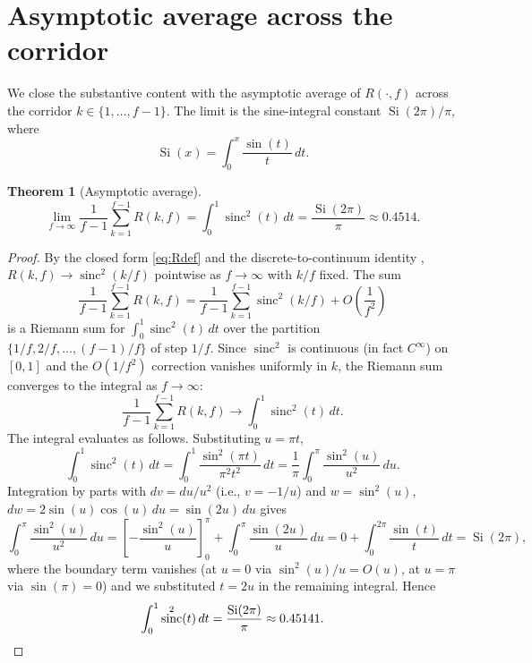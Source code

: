\documentclass[11pt,reqno]{amsart}
\theoremstyle{plain}
\newtheorem{theorem}{Theorem}[section]
\theoremstyle{definition}
\theoremstyle{remark}
\DeclareMathOperator{\sinc}{sinc}
\DeclareMathOperator{\Si}{Si}
\begin{document}
\section{Asymptotic average across the corridor}\label{sec:asymptotic}

We close the substantive content with the asymptotic average of
$R(\cdot, f)$ across the corridor $k \in \{1, \ldots, f-1\}$. The
limit is the sine-integral constant $\Si(2\pi)/\pi$, where
\[
  \Si(x) = \int_{0}^{x} \frac{\sin(t)}{t}\, dt.
\]

\begin{theorem}[Asymptotic average]\label{thm:asymptotic}
\[
  \lim_{f \to \infty} \frac{1}{f-1} \sum_{k=1}^{f-1} R(k, f)
  = \int_{0}^{1} \sinc^{2}(t)\, dt
  = \frac{\Si(2\pi)}{\pi}
  \approx 0.4514.
\]
\end{theorem}

\begin{proof}
By the closed form \eqref{eq:Rdef} and the discrete-to-continuum
identity \cite[Theorem~6.1]{SandersGish2026FirstG}, $R(k, f) \to
\sinc^{2}(k/f)$ pointwise as $f \to \infty$ with $k/f$ fixed. The
sum
\[
  \frac{1}{f-1} \sum_{k=1}^{f-1} R(k, f)
  = \frac{1}{f-1} \sum_{k=1}^{f-1} \sinc^{2}(k/f)
  + O\!\left(\frac{1}{f^{2}}\right)
\]
is a Riemann sum for $\int_{0}^{1} \sinc^{2}(t)\, dt$ over the
partition $\{1/f, 2/f, \ldots, (f-1)/f\}$ of step $1/f$. Since
$\sinc^{2}$ is continuous (in fact $C^{\infty}$) on $[0, 1]$ and the
$O(1/f^{2})$ correction vanishes uniformly in $k$, the Riemann sum
converges to the integral as $f \to \infty$:
\[
  \frac{1}{f-1} \sum_{k=1}^{f-1} R(k, f)
  \longrightarrow \int_{0}^{1} \sinc^{2}(t)\, dt.
\]
The integral evaluates as follows. Substituting $u = \pi t$,
\[
  \int_{0}^{1} \sinc^{2}(t)\, dt
  = \int_{0}^{1} \frac{\sin^{2}(\pi t)}{\pi^{2} t^{2}}\, dt
  = \frac{1}{\pi} \int_{0}^{\pi} \frac{\sin^{2}(u)}{u^{2}}\, du.
\]
Integration by parts with $dv = du/u^{2}$ (i.e., $v = -1/u$) and
$w = \sin^{2}(u)$, $dw = 2 \sin(u)\cos(u)\, du = \sin(2u)\, du$ gives
\[
  \int_{0}^{\pi} \frac{\sin^{2}(u)}{u^{2}}\, du
  = \left[-\frac{\sin^{2}(u)}{u}\right]_{0}^{\pi}
    + \int_{0}^{\pi} \frac{\sin(2u)}{u}\, du
  = 0 + \int_{0}^{2\pi} \frac{\sin(t)}{t}\, dt
  = \Si(2\pi),
\]
where the boundary term vanishes (at $u = 0$ via $\sin^{2}(u)/u =
O(u)$, at $u = \pi$ via $\sin(\pi) = 0$) and we substituted $t = 2u$
in the remaining integral. Hence
\[
  \int_{0}^{1} \sinc^{2}(t)\, dt = \frac{\Si(2\pi)}{\pi}
  \approx 0.45141.
\qedhere
\]
\end{proof}
\end{document}
